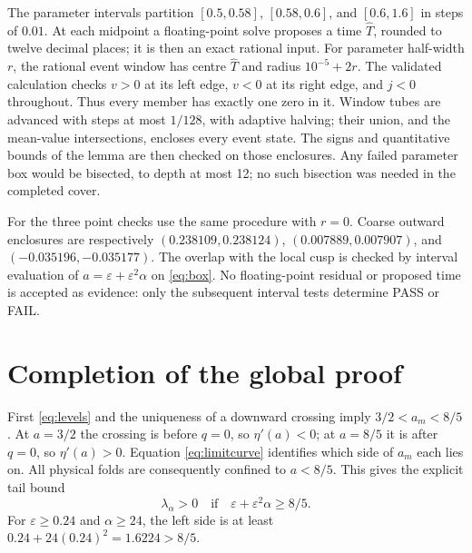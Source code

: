\documentclass[11pt,a4paper]{report}
\begin{document}
The parameter intervals partition $[0.5,0.58]$, $[0.58,0.6]$, and
$[0.6,1.6]$ in steps of $0.01$. At each midpoint a floating-point solve
proposes a time $\widehat T$, rounded to twelve decimal places; it is then
an exact rational input. For parameter half-width $r$, the rational event
window has centre $\widehat T$ and radius $10^{-5}+2r$.
The validated calculation checks $v>0$ at its left edge, $v<0$ at its right
edge, and $j<0$ throughout. Thus every member has exactly one zero in it.
Window tubes are advanced with steps at most $1/128$, with adaptive halving;
their union, and the mean-value intersections, encloses every event state.
The signs and quantitative bounds of the lemma are then checked on those
enclosures. Any failed parameter box would be bisected, to depth at most 12;
no such bisection was needed in the completed cover.

For the three point checks use the same procedure with $r=0$.
Coarse outward enclosures are respectively
$(0.238109,0.238124)$, $(0.007889,0.007907)$, and
$(-0.035196,-0.035177)$.
The overlap with the local cusp is checked by interval evaluation of
$a=\varepsilon+\varepsilon^2\alpha$ on \eqref{eq:box}.
No floating-point residual or proposed time is accepted as evidence:
only the subsequent interval tests determine PASS or FAIL.

\section{Completion of the global proof}
First \eqref{eq:levels} and the uniqueness of a downward crossing imply
$3/2<a_m<8/5$. At $a=3/2$ the crossing is before $q=0$, so
$\eta'(a)<0$; at $a=8/5$ it is after $q=0$, so $\eta'(a)>0$.
Equation \eqref{eq:limitcurve} identifies which side of $a_m$ each lies on.
All physical folds are consequently confined to $a<8/5$. This gives the
explicit tail bound
\begin{equation}\label{eq:sharptail}
 \lambda_\alpha>0\quad\text{if}\quad
 \varepsilon+\varepsilon^2\alpha\geq8/5.
\end{equation}
For $\varepsilon\geq0.24$ and $\alpha\geq24$, the left side is at least
$0.24+24(0.24)^2=1.6224>8/5$.
\end{document}
